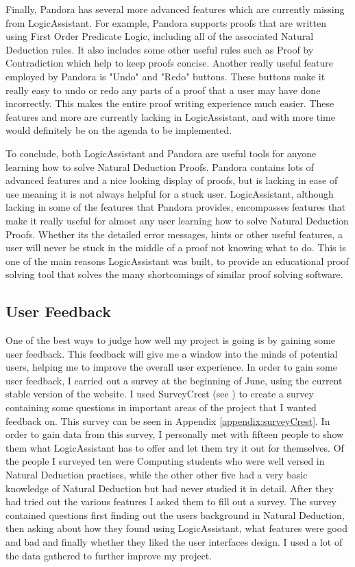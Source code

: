 Finally, Pandora has several more advanced features which are currently missing from LogicAssistant. For example, Pandora supports proofs that are written using First Order Predicate Logic, including all of the associated Natural Deduction rules. It also includes some other useful rules such as Proof by Contradiction which help to keep proofs concise. Another really useful feature employed by Pandora is "Undo" and "Redo" buttons. These buttons make it really easy to undo or redo any parts of a proof that a user may have done incorrectly. This makes the entire proof writing experience much easier. These features and more are currently lacking in LogicAssistant, and with more time would definitely be on the agenda to be implemented.

To conclude, both LogicAssistant and Pandora are useful tools for anyone learning how to solve Natural Deduction Proofs. Pandora contains lots of advanced features and a nice looking display of proofs, but is lacking in ease of use meaning it is not always helpful for a stuck user. LogicAssistant, although lacking in some of the features that Pandora provides, encompasses features that make it really useful for almost any user learning how to solve Natural Deduction Proofs. Whether its the detailed error messages, hints or other useful features, a user will never be stuck in the middle of a proof not knowing what to do. This is one of the main reasons LogicAssistant was built, to provide an educational proof solving tool that solves the many shortcomings of similar proof solving software.

\subsection{User Feedback}

One of the best ways to judge how well my project is going is by gaining some user feedback. This feedback will give me a window into the minds of potential users, helping me to improve the overall user experience. In order to gain some user feedback, I carried out a survey at the beginning of June, using the current stable version of the website. I used SurveyCrest (see \cite{surveyCrest}) to create a survey containing some questions in important areas of the project that I wanted feedback on. This survey can be seen in Appendix \ref{appendix:surveyCrest}. In order to gain data from this survey, I personally met with fifteen people to show them what LogicAssistant has to offer and let them try it out for themselves. Of the people I surveyed ten were Computing students who were well versed in Natural Deduction practises, while the other other five had a very basic knowledge of Natural Deduction but had never studied it in detail. After they had tried out the various features I asked them to fill out a survey. The survey contained questions first finding out the users background in Natural Deduction, then asking about how they found using LogicAssistant, what features were good and bad and finally whether they liked the user interfaces design. I used a lot of the data gathered to further improve my project.

